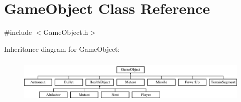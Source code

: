 \hypertarget{class_game_object}{}\section{Game\+Object Class Reference}
\label{class_game_object}


{\ttfamily \#include $<$Game\+Object.\+h$>$}

Inheritance diagram for Game\+Object\+:\begin{figure}[H]
\begin{center}
\leavevmode
\includegraphics[height=2.201835cm]{class_game_object}
\end{center}
\end{figure}
